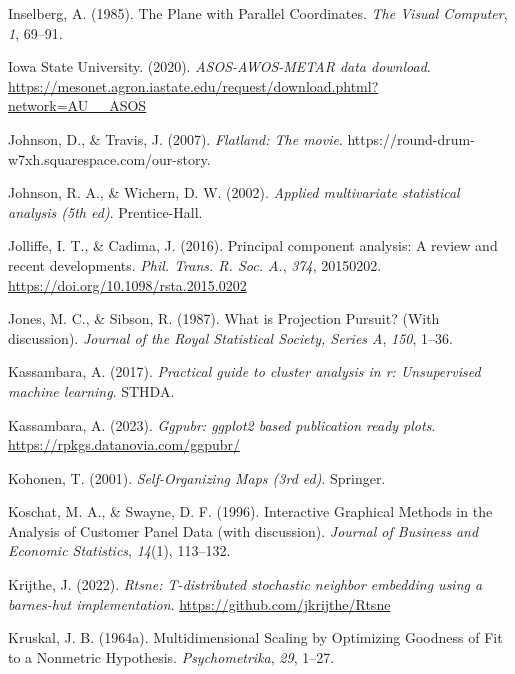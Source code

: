 \documentclass[
  letterpaper,
]{krantz}
\newlength{\cslhangindent}
\newenvironment{CSLReferences}[2] %
 {\begin{list}{}{%
  \setlength{\itemindent}{0pt}
  \setlength{\leftmargin}{0pt}
  \setlength{\parsep}{0pt}
  \ifodd #1
   \setlength{\leftmargin}{\cslhangindent}
   \setlength{\itemindent}{-1\cslhangindent}
  \fi
  \setlength{\itemsep}{#2\baselineskip}}}
 {\end{list}}
\begin{document}
\begin{CSLReferences}{1}{0}
Inselberg, A. (1985). {T}he {P}lane with {P}arallel {C}oordinates.
\emph{The Visual Computer}, \emph{1}, 69--91.

Iowa State University. (2020). \emph{ASOS-AWOS-METAR data download}.
\url{https://mesonet.agron.iastate.edu/request/download.phtml?network=AU__ASOS}

Johnson, D., \& Travis, J. (2007). \emph{Flatland: The movie}.
https://round-drum-w7xh.squarespace.com/our-story.

Johnson, R. A., \& Wichern, D. W. (2002). \emph{Applied multivariate
statistical analysis (5th ed)}. Prentice-Hall.

Jolliffe, I. T., \& Cadima, J. (2016). Principal component analysis: A
review and recent developments. \emph{Phil. Trans. R. Soc. A.},
\emph{374}, 20150202. \url{https://doi.org/10.1098/rsta.2015.0202}

Jones, M. C., \& Sibson, R. (1987). {W}hat is {P}rojection {P}ursuit?
(With discussion). \emph{Journal of the Royal Statistical Society,
Series A}, \emph{150}, 1--36.

Kassambara, A. (2017). \emph{Practical guide to cluster analysis in r:
Unsupervised machine learning}. STHDA.

Kassambara, A. (2023). \emph{Ggpubr: ggplot2 based publication ready
plots}. \url{https://rpkgs.datanovia.com/ggpubr/}

Kohonen, T. (2001). \emph{Self-{O}rganizing {M}aps (3rd ed)}. Springer.

Koschat, M. A., \& Swayne, D. F. (1996). Interactive {G}raphical
{M}ethods in the {A}nalysis of {C}ustomer {P}anel {D}ata (with
discussion). \emph{Journal of Business and Economic Statistics},
\emph{14}(1), 113--132.

Krijthe, J. (2022). \emph{Rtsne: T-distributed stochastic neighbor
embedding using a barnes-hut implementation}.
\url{https://github.com/jkrijthe/Rtsne}

Kruskal, J. B. (1964a). Multidimensional {S}caling by {O}ptimizing
{G}oodness of {F}it to a {N}onmetric {H}ypothesis. \emph{Psychometrika},
\emph{29}, 1--27.


\end{CSLReferences}
\end{document}
